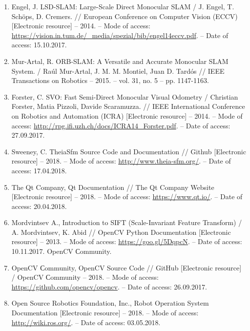 \begin{enumerate}
    \item \label{itm:lsd} Engel, J. LSD-SLAM: Large-Scale Direct Monocular SLAM / J. Engel, T. Schöps, D. Cremers. // European Conference on Computer Vision (ECCV) [Electronic resource] -- 2014. -- Mode of access: \url{https://vision.in.tum.de/_media/spezial/bib/engel14eccv.pdf}. -- Date of access: 15.10.2017.
    
    \item \label{itm:orbslam} Mur-Artal, R. ORB-SLAM: A Versatile and Accurate Monocular SLAM System. / Raúl Mur-Artal, J. M. M. Montiel, Juan D. Tardós // IEEE Transactions on Robotics -- 2015. -- vol. 31, no. 5 -- pp. 1147-1163.
    
    \item \label{itm:svo} Forster, C. SVO: Fast Semi-Direct Monocular Visual Odometry / Christian Forster, Matia Pizzoli, Davide Scaramuzza. // IEEE International Conference on Robotics and Automation (ICRA) [Electronic resource] -- 2014. -- Mode of access: \url{http://rpg.ifi.uzh.ch/docs/ICRA14_Forster.pdf}. -- Date of access: 27.09.2017.
    
    \newpage
    
    \item \label{itm:theia} Sweeney, C. TheiaSfm Source Code and Documentation // Github [Electronic resource] -- 2018. -- Mode of access: \url{http://www.theia-sfm.org/}. -- Date of access: 17.04.2018.

    \item \label{itm:qt} The Qt Company, Qt Documentation // The Qt Company Website  [Electronic resource] -- 2018. -- Mode of access: \url{https://www.qt.io/}. -- Date of access: 20.04.2018.
    
    \item \label{itm:sift} Mordvintsev A., Introduction to SIFT (Scale-Invariant Feature Transform) / A. Mordvintsev, K. Abid // OpenCV Python Documentation [Electronic resource] -- 2013. -- Mode of access: \url{https://goo.gl/5DqpcN}. -- Date of access: 10.11.2017.
OpenCV Сommunity.

    \item \label{itm:opencv} OpenCV Сommunity, OpenCV Source Code // GitHub [Electronic resource] / OpenCV Сommunity -- 2018. -- Mode of access: \url{https://github.com/opencv/opencv}. -- Date of access: 26.09.2017.

    \item \label{itm:last}\label{itm:ros} Open Source Robotics Foundation, Inc., Robot Operation System Documentation [Electronic resource] -- 2018. -- Mode of access: \url{http://wiki.ros.org/}. -- Date of access: 03.05.2018.
\end{enumerate}

\newpage
